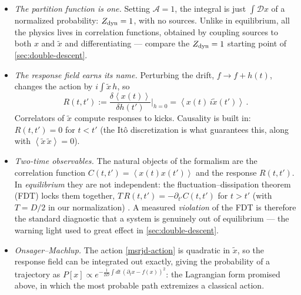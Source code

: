 \documentclass[11pt]{article}
\newcommand{\pd}{\partial}
\newcommand{\expval}[1]{\left\langle #1 \right\rangle}
\begin{document}
\begin{itemize}
    \item \emph{The partition function is one.} Setting $\mathcal{A}=1$, the integral is just $\int \mathcal Dx$ of a normalized probability: $Z_{\rm dyn}=1$, with no sources. Unlike in equilibrium, all the physics lives in correlation functions, obtained by coupling sources to both $x$ and $\tilde x$ and differentiating --- compare the $Z_{\rm dyn}=1$ starting point of \cref{sec:double-descent}.
    \item \emph{The response field earns its name.} Perturbing the drift, $f \to f + h(t)$, changes the action by $i\int \tilde x\, h$, so
    \begin{equation} \label{response-def}
        R(t,t') := \frac{\delta \expval{x(t)}}{\delta h(t')}\bigg|_{h=0} = \expval{x(t)\, i \tilde x(t')}\,.
    \end{equation}
    Correlators of $\tilde x$ compute responses to kicks. Causality is built in: $R(t,t')=0$ for $t<t'$ (the It\^o discretization is what guarantees this, along with $\expval{\tilde x\, \tilde x} = 0$).
    \item \emph{Two-time observables.} The natural objects of the formalism are the correlation function $C(t,t') = \expval{x(t)x(t')}$ and the response $R(t,t')$. In \emph{equilibrium} they are not independent: the fluctuation--dissipation theorem (FDT) locks them together, $T\, R(t,t') = -\pd_{t'} C(t,t')$ for $t>t'$ (with $T = D/2$ in our normalization) \cite{kuboStatisticalMechanicalTheoryIrreversible1957,kuboFluctuationdissipationTheorem1966}. A measured \emph{violation} of the FDT is therefore the standard diagnostic that a system is genuinely out of equilibrium --- the warning light used to great effect in \cref{sec:double-descent}.
    \item \emph{Onsager--Machlup.} The action \eqref{msrjd-action} is quadratic in $\tilde x$, so the response field can be integrated out exactly, giving the probability of a trajectory as $P[x] \propto e^{-\frac{1}{2D}\int dt\, (\partial_t x - f(x))^2}$: the Lagrangian form promised above, in which the most probable path extremizes a classical action.
\end{itemize}
\end{document}
